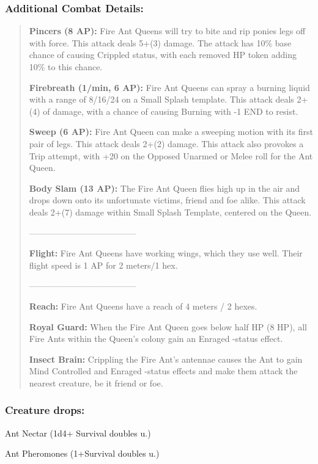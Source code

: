 \documentclass[11pt,a4paper,twocolumn]{book}
\begin{document}
	\subsubsection*{Additional Combat Details:}
	\begin{verse}
		\textbf{Pincers (8 AP):} Fire Ant Queens will try to bite and rip ponies legs off with force. This attack deals 5+(3) damage. The attack has 10\% base chance of causing Crippled status, with each removed HP token adding 10\% to this chance.
		
		\textbf{Firebreath (1/min, 6 AP):} Fire Ant Queens can spray a burning liquid with a range of 8/16/24 on a Small Splash template. This attack deals 2+(4) of damage, with a chance of causing Burning with -1 END to resist.
		
		\textbf{Sweep (6 AP):} Fire Ant Queen can make a sweeping motion with its first pair of legs. This attack deals 2+(2) damage. This attack also provokes a Trip attempt, with +20 on the Opposed Unarmed or Melee roll for the Ant Queen.
		
		\textbf{Body Slam (13 AP):} The Fire Ant Queen flies high up in the air and drops down onto its unfortunate victims, friend and foe alike. This attack deals 2+(7) damage within Small Splash Template, centered on the Queen.
		
		--------------------------------------
		
		\textbf{Flight:} Fire Ant Queens have working wings, which they use well. Their flight speed is 1 AP for 2 meters/1 hex.		
		
		--------------------------------------
		
		\textbf{Reach:} Fire Ant Queens have a reach of 4 meters / 2 hexes.
		
		\textbf{Royal Guard:} When the Fire Ant Queen goes below half HP (8 HP), all Fire Ants within the Queen's colony gain an Enraged -status effect.
				
		\textbf{Insect Brain:} Crippling the Fire Ant's antennae causes the Ant to gain Mind Controlled and Enraged -status effects and make them attack the nearest creature, be it friend or foe.
	\end{verse}
	
	
	\subsubsection*{Creature drops:}
	\begin{compactitem}
		\item Ant Nectar (1d4+ Survival doubles u.)
		\item Ant Pheromones (1+Survival doubles u.)
	\end{compactitem}
	
\end{document}
